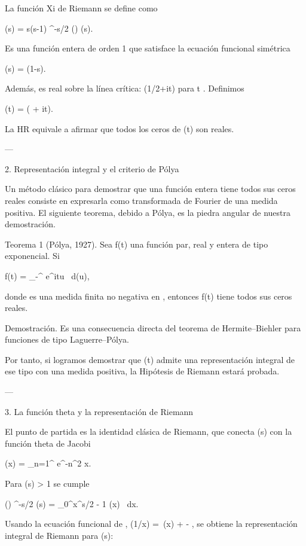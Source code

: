 \documentclass[12pt,twoside]{book}
\begin{document}
La función Xi de Riemann se define como

\xi(s) =  s(s-1) \pi^{-s/2} \Gamma\!\left(\right) \zeta(s).
\]  

Es una función entera de orden 1 que satisface la ecuación funcional simétrica

\xi(s) = \xi(1-s).
\]  

Además, es real sobre la línea crítica: \xi(1/2+it) \in {} para t \in {}.
Definimos

\Xi(t) = \xi\!\left( + it\right).
\]  

La HR equivale a afirmar que todos los ceros de \Xi(t) son reales.

---

2. Representación integral y el criterio de Pólya

Un método clásico para demostrar que una función entera tiene todos sus ceros reales consiste en expresarla como transformada de Fourier de una medida positiva. El siguiente teorema, debido a Pólya, es la piedra angular de nuestra demostración.

Teorema 1 (Pólya, 1927). Sea f(t) una función par, real y entera de tipo exponencial. Si

f(t) = \int_{-\infty}^{\infty} e^{itu} \, d\nu(u),
\]  

donde \nu es una medida finita no negativa en , entonces f(t) tiene todos sus ceros reales.

Demostración. Es una consecuencia directa del teorema de Hermite–Biehler para funciones de tipo Laguerre–Pólya.

Por tanto, si logramos demostrar que \Xi(t) admite una representación integral de ese tipo con una medida \nu positiva, la Hipótesis de Riemann estará probada.

---

3. La función theta y la representación de Riemann

El punto de partida es la identidad clásica de Riemann, que conecta \zeta(s) con la función theta de Jacobi

\psi(x) = \sum_{n=1}^{\infty} e^{-\pi n^2 x}.
\]  

Para \Re(s) > 1 se cumple

\Gamma\!\left(\right) \pi^{-s/2} \zeta(s) = \int_0^\infty x^{s/2 - 1} \psi(x) \, dx.
\]  

Usando la ecuación funcional de \psi, \psi(1/x) = \,\psi(x) +  - , se obtiene la representación integral de Riemann para \xi(s):
\end{document}
